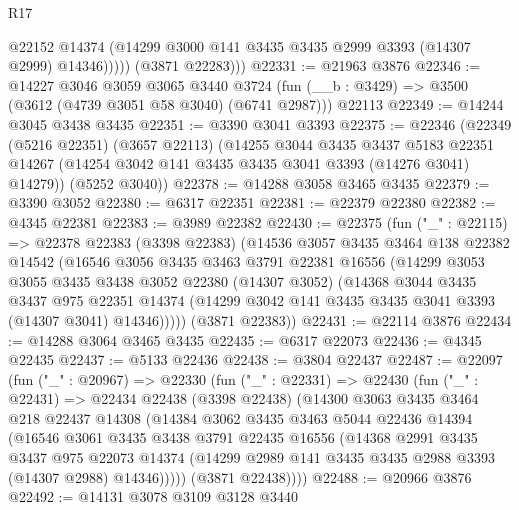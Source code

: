\begin{lexlean}{R17}
\begin{coremodule}
                @22152
                @14374
                (@14299 @3000 @141 @3435 @3435 @2999 @3393 (@14307 @2999) @14346)))))
        (@3871 @22283)))
@22331 := @21963 @3876
@22346 := @14227
    @3046
    @3059
    @3065
    @3440
    @3724
    (fun (__b : @3429) => @3500 (@3612 (@4739 @3051 @58 @3040) (@6741 @2987)))
    @22113
@22349 := @14244 @3045 @3438 @3435
@22351 := @3390 @3041 @3393
@22375 := @22346
    (@22349
      (@5216 @22351)
      (@3657 @22113)
      (@14255
        @3044
        @3435
        @3437
        @5183
        @22351
        @14267
        (@14254 @3042 @141 @3435 @3435 @3041 @3393 (@14276 @3041) @14279))
      (@5252 @3040))
@22378 := @14288 @3058 @3465 @3435
@22379 := @3390 @3052
@22380 := @6317 @22351
@22381 := @22379 @22380
@22382 := @4345 @22381
@22383 := @3989 @22382
@22430 := @22375
    (fun ("_" : @22115) =>
    @22378
      @22383
      (@3398 @22383)
      (@14536
        @3057
        @3435
        @3464
        @138
        @22382
        @14542
        (@16546
          @3056
          @3435
          @3463
          @3791
          @22381
          @16556
          (@14299
            @3053
            @3055
            @3435
            @3438
            @3052
            @22380
            (@14307 @3052)
            (@14368
              @3044
              @3435
              @3437
              @975
              @22351
              @14374
              (@14299 @3042 @141 @3435 @3435 @3041 @3393 (@14307 @3041) @14346)))))
      (@3871 @22383))
@22431 := @22114 @3876
@22434 := @14288 @3064 @3465 @3435
@22435 := @6317 @22073
@22436 := @4345 @22435
@22437 := @5133 @22436
@22438 := @3804 @22437
@22487 := @22097
    (fun ("_" : @20967) =>
    @22330
      (fun ("_" : @22331) =>
      @22430
        (fun ("_" : @22431) =>
        @22434
          @22438
          (@3398 @22438)
          (@14300
            @3063
            @3435
            @3464
            @218
            @22437
            @14308
            (@14384
              @3062
              @3435
              @3463
              @5044
              @22436
              @14394
              (@16546
                @3061
                @3435
                @3438
                @3791
                @22435
                @16556
                (@14368
                  @2991
                  @3435
                  @3437
                  @975
                  @22073
                  @14374
                  (@14299 @2989 @141 @3435 @3435 @2988 @3393 (@14307 @2988) @14346)))))
          (@3871 @22438))))
@22488 := @20966 @3876
@22492 := @14131 @3078 @3109 @3128 @3440

\end{coremodule}
\end{lexlean}
